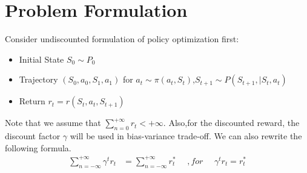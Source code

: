 \section{Problem Formulation}
\label{section:problem}
Consider undiscounted formulation of policy optimization first:
\begin{itemize}
    \item Initial State $S_0 \sim P_0$
    \item Trajectory $(S_0,a_0,S_1,a_1)$ for $a_t \sim \pi(a_t,S_t)$,$S_{t+1} \sim P(S_{t+1},|S_t,a_t)$
    \item Return $r_t = r(S_t,a_t,S_{t+1})$
\end{itemize}
Note that we assume that $\sum_{n=0}^{+\infty} r_t < +\infty$.\newline
Also,for the discounted reward, the discount factor $\gamma$ will be used in bias-variance trade-off.\newline
We can also rewrite the following formula.\newline
\begin{align*}
  {\sum_{n=-\infty}^{+\infty} \gamma^tr_t} &= {\sum_{n=-\infty}^{+\infty} r^*_t} ~~~~~~,for~~~~~~{\gamma^tr_t} = {r^*_t}
\end{align*}